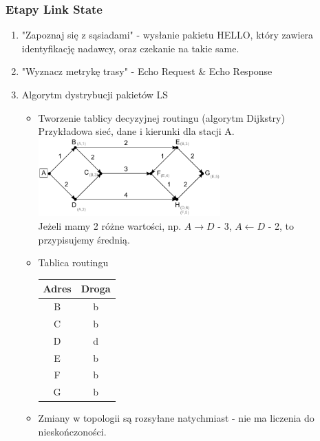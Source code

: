 \documentclass[a4paper,twoside]{article}
\begin{document}
			\subsubsection{Etapy Link State}
				\begin{enumerate}
					\item "Zapoznaj się z sąsiadami" - wysłanie pakietu HELLO, który zawiera identyfikację nadawcy, oraz czekanie na takie same.
					\item "Wyznacz metrykę trasy" - Echo Request \& Echo Response
					\item Algorytm dystrybucji pakietów LS
					\begin{itemize}
						\item Tworzenie tablicy decyzyjnej routingu (algorytm Dijkstry)\\
						Przykładowa sieć, dane i kierunki dla stacji A.\\
						\includegraphics[width=7.0cm]{./images/image45.pdf}\\
						Jeżeli mamy 2 różne wartości, np. $ A\rightarrow D$ - 3, $ A\leftarrow D$ - 2, to przypisujemy średnią.
						\item Tablica routingu\\
						\begin{tabular}{|c|c|}
							\hline
							\multicolumn{1}{|c|}{\textbf{Adres}}           & \textbf{Droga}      \\ \hline
							\multicolumn{1}{|c|}{B}               & b          \\ \hline
							\multicolumn{1}{|c|}{C}               & b          \\ \hline
							\multicolumn{1}{|c|}{D}               & d          \\ \hline
							\multicolumn{1}{|c|}{E}               & b          \\ \hline
							\multicolumn{1}{|c|}{F}               & b          \\ \hline
							\multicolumn{1}{|c|}{G}               & b          \\ \hline
						\end{tabular}
						\item Zmiany w topologii są rozsyłane natychmiast - nie ma liczenia do nieskończoności.
					\end{itemize}
				\end{enumerate}
\end{document}
